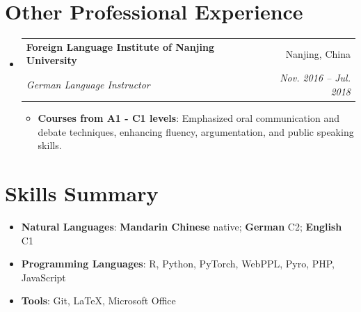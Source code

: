 \documentclass[letterpaper,11pt]{article}
\makeatletter
\newcommand{\resumeItem}[2]{
  \item\small{
    \textbf{#1}{: #2 \vspace{-2pt}}
  }
}
\newcommand{\resumeSubheading}[4]{
  \vspace{-1pt}\item
    \begin{tabular*}{0.97\textwidth}{l@{\extracolsep{\fill}}r}
      \textbf{#1} & #2 \\
      \textit{\small#3} & \textit{\small #4} \\
    \end{tabular*}\vspace{-5pt}
}
\newcommand{\resumeSubItem}[2]{\resumeItem{#1}{#2}\vspace{-4pt}}
\newcommand{\resumeSubHeadingListStart}{\begin{itemize}[leftmargin=*]}
\newcommand{\resumeSubHeadingListEnd}{\end{itemize}}
\newcommand{\resumeItemListStart}{\begin{itemize}}
\newcommand{\resumeItemListEnd}{\end{itemize}\vspace{-5pt}}
\makeatother
\begin{document}
\section{Other Professional Experience}
  \resumeSubHeadingListStart
      
  
  \resumeSubheading
		{Foreign Language Institute of Nanjing University}{Nanjing, China}
		 {German Language Instructor}{Nov. 2016 -- Jul. 2018}
		\resumeItemListStart
        \resumeItem{Courses from A1 - C1 levels}
          {Emphasized oral communication and debate techniques, enhancing fluency, argumentation, and public speaking skills.}
		\resumeItemListEnd

    
\resumeSubHeadingListEnd

%
\section{Skills Summary}
	\resumeSubHeadingListStart
		\resumeSubItem{Natural Languages}{\textbf{Mandarin Chinese} native; \textbf{German} C2; \textbf{English} C1}
 \resumeSubItem{Programming Languages}{R, Python, PyTorch, WebPPL, Pyro, PHP, JavaScript}
		\resumeSubItem{Tools}{Git, LaTeX, Microsoft Office}
\resumeSubHeadingListEnd

\end{document}
